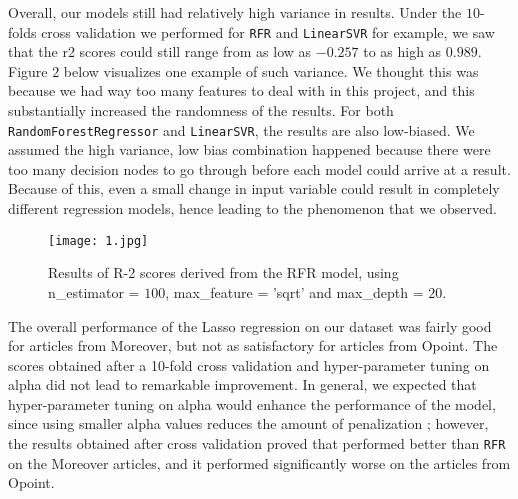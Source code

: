 Overall, our models still had relatively high variance in results. Under the $10$-folds cross validation we performed for \texttt{RFR} and \texttt{LinearSVR} for example, we saw that the r2 scores could still range from as low as $-0.257$ to as high as $0.989$. Figure $2$ below visualizes one example of such variance. We thought this was because we had way too many features to deal with in this project, and this substantially increased the randomness of the results. For both \texttt{RandomForestRegressor} and \texttt{LinearSVR}, the results are also low-biased. We assumed the high variance, low bias combination happened because there were too many decision nodes to go through before each model could arrive at a result. Because of this, even a small change in input variable could result in completely different regression models, hence leading to the phenomenon that we observed.\\
\begin{figure}[htb]

  \centering  %

  \texttt{[image: 1.jpg]}

  \caption{Results of R-2 scores derived from the RFR model, using n\_estimator = $100$, max\_feature = 'sqrt' and max\_depth = $20$. }

  \label{fig:tex}
\end{figure}

The overall performance of the Lasso regression on our dataset was fairly good for articles from Moreover, but not as satisfactory for articles from Opoint. The scores obtained after a 10-fold cross validation and hyper-parameter tuning on alpha did not lead to remarkable improvement. In general, we expected that hyper-parameter tuning on alpha would enhance the performance of the model, since using smaller alpha values reduces the amount of penalization \cite{AnalyticsVidhya}; however, the results obtained after cross validation proved that  performed better than \texttt{RFR} on the Moreover articles, and it performed significantly worse on the articles from Opoint. 


